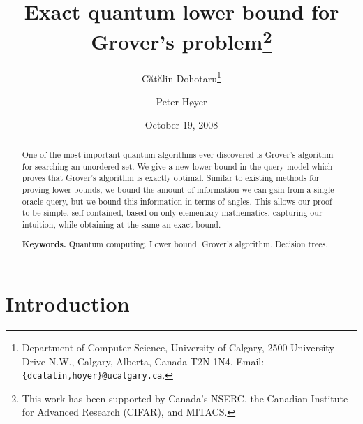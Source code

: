 \documentclass{article}
\date{October 19, 2008}
\newenvironment{keywords}{\begin{trivlist}\item[]{\flushleft\bf Keywords. }}
{\end{trivlist}}
\begin{document}

\title{Exact quantum lower bound for Grover's problem\footnote{This
    work has been supported by Canada's NSERC, the Canadian Institute
    for Advanced Research (CIFAR), and MITACS.}}

\author{%
C\u{a}t\u{a}lin Dohotaru\thanks{%
Department of Computer Science, 
University of Calgary,
2500 University Drive N.W.,
Calgary, Alberta, Canada T2N 1N4.
Email: \texttt{\{dcatalin,hoyer\}@ucalgary.ca}.}
\and 
Peter H{\o}yer\footnotemark[2]
}

\maketitle

\begin{abstract}
  One of the most important quantum algorithms ever discovered is
  Grover's algorithm for searching an unordered set.  We give a new
  lower bound in the query model which proves that Grover's algorithm
  is exactly optimal.  Similar to existing methods for proving lower
  bounds, we bound the amount of information we can gain from a single
  oracle query, but we bound this information in terms of angles.
  This allows our proof to be simple, self-contained, based on only
  elementary mathematics, capturing our intuition, while obtaining at
  the same an exact bound.

  \medskip
  \begin{keywords}
    Quantum computing.  Lower bound.  Grover's algorithm.  Decision
    trees.
  \end{keywords}
\end{abstract}



\section{Introduction}
\label{sec:intro}
\end{document}
